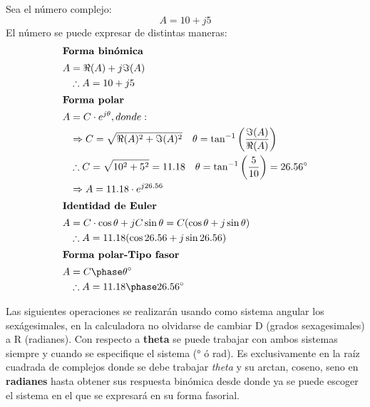 \documentclass[
	12pt, %
	fleqn, %
	a4paper, %
	oneside, %
]{LegrandOrangeBook}
\begin{document}
Sea el número complejo:
\begin{equation}
\label{art:numeroscomplejos}
A=10 + j5
\end{equation}
El número se puede expresar de distintas maneras:
\begin{align*}
\intertext{\textbf{Forma binómica}}
A&=\Re(A) + j\Im(A)\\
&\therefore A=10 + j5\\
\intertext{\textbf{Forma polar}}
A&=C\cdot e^{j\theta}, donde:\\
&\Rightarrow C=\sqrt{\Re(A)^2 + \Im(A)^2}\hspace{10pt}\theta=\tan^{-1}\left(\frac{\Im(A)}{\Re(A)}\right)\\
&\therefore C=\sqrt{10^2+5^2}=11.18\hspace{10pt}\theta=\tan^{-1}\left(\frac{5}{10}\right)=26.56^{\circ}\\
&\Rightarrow A=11.18\cdot e^{j 26.56}\\
\intertext{\textbf{Identidad de Euler}}
A&=C\cdot\cos\theta+jC\sin\theta=C(\cos\theta+j\sin\theta)\\
&\therefore A=11.18(\cos 26.56+j\sin 26.56)\\
\intertext{\textbf{Forma polar-Tipo fasor}}
A&=\fase{C}{\theta}\\
&\therefore A=\fase{11.18}{26.56}
\end{align*}
\begin{remark}
Las siguientes operaciones se realizarán usando como sistema angular los sexágesimales, en la calculadora no olvidarse de cambiar D (grados sexagesimales) a R (radianes). Con respecto a \textbf{theta} se puede trabajar con ambos sistemas siempre y cuando se especifique el sistema (° ó  rad). Es exclusivamente en la raíz cuadrada de complejos donde se debe trabajar \textit{theta} y su arctan, coseno, seno en \textbf{radianes} hasta obtener sus respuesta binómica desde donde ya se puede escoger el sistema en el que se expresará en su forma fasorial.
\end{remark}
\end{document}
